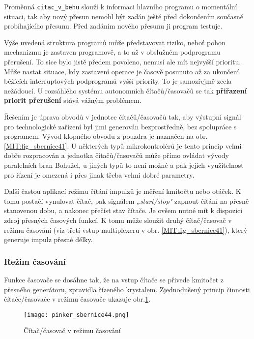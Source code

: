         Proměnná \texttt{citac\_v\_behu} slouží k informaci hlavního programu o momentální situaci, 
        tak aby nový přesun nemohl být zadán ještě před dokončením současně probíhajícího přesunu. 
        Před zadáním nového přesunu ji program testuje.
        
        Výše uvedená struktura programů může představovat riziko, neboť pohon mechanizmu je 
        zastaven programově, a to až v obslužném podprogramu přerušení. To sice bylo jistě předem 
        povoleno, nemusí ale mít nejvyšší prioritu. Může nastat situace, kdy zastavení operace je 
        časově posunuto až za ukončení běžících interruptových podprogramů vyšší priority. To je 
        samozřejmě zcela nežádoucí. U rozsáhlého systému autonomních čítačů/časovačů se tak 
        \textbf{přiřazení priorit přerušení} stává vážným problémem.
        
        Řešením je úprava obvodů v jednotce čítačů/časovačů tak, aby výstupní signál pro 
        technologické zařízení byl jimi generován bezprostředně, bez spolupráce s programem. Vývod 
        klopného obvodu z pouzdra je naznačen na obr. \ref{MIT:fig_sbernice41}. U některých typů 
        mikrokontrolérů je tento princip velmi dobře rozpracován a jednotka čítačů/časovačů může 
        přímo ovládat vývody paralelních bran Bohužel, u jiných typů to není možné a pak jejich 
        využitelnost pro řízení je omezená i přes jinak třeba velmi dobré parametry.
        
        Další častou aplikací režimu čítání impulzů je měření kmitočtu nebo otáček. K tomu postačí 
        vynulovat čítač, pak signálem \emph{„start/stop"} zapnout čítání na přesně stanovenou dobu, 
        a nakonec přečíst stav čítače. Je ovšem nutné mít k dispozici zdroj přesných časových 
        funkcí. K tomu může sloužit druhý čítač/časovač v režimu časování (viz třetí vstup 
        multiplexeru v obr. \ref{MIT:fig_sbernice41}), který generuje impulz přesné délky.
        
      \subsubsection{Režim časování}
        Funkce časovače se dosáhne tak, že na vstup čítače se přivede kmitočet z přesného 
        generátoru, zpravidla řízeného krystalem. Zjednodušený princip činnosti čítače/časovače v 
        režimu časovače ukazuje obr.\ref{MIT:fig_sbernice44}.
        
        \begin{figure}[ht!] %
          \centering
          \texttt{[image: pinker\_sbernice44.png]}
          \caption{Čítač/časovač v režimu časování}
          \label{MIT:fig_sbernice44}
        \end{figure}
        
